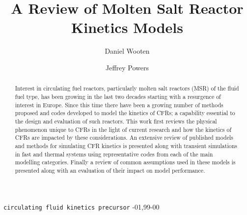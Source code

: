 \documentclass[review]{elsarticle}
\begin{document}
\begin{frontmatter}

\title{A Review of Molten Salt Reactor Kinetics Models}

\author[ucb]{Daniel Wooten}
\address[ucb]{4155 Etcheverry Hall, MC 1730, University of California, Berkeley,
    Berkeley, CA 94720-1730}

\author[ornl]{Jeffrey Powers}
\address[ornl]{Oak Ridge}

\begin{abstract}
Interest in circulating fuel reactors, particularly molten salt reactors (MSR)
 of the
fluid fuel type, has been growing in the last two decades starting with a
resurgence of interest in Europe. Since this time there have been a growing
number of methods proposed and codes developed to model the kinetics of CFRs;
a capability essential to the design and evaluation of such reactors. This work
first reviews the physical phenomenon unique to CFRs in the light of current
research and how the kinetics of CFRs are impacted by these considerations.
 An extensive review of published models and methods for simulating CFR kinetics
is presented along with transient simulations in fast and thermal systems using
representative codes from each of the main modelling categories. Finally a
review of common assumptions used in these models is presented along with an
evaluation of their impact on model performance. 
\end{abstract}

\begin{keyword}
\texttt{circulating fluid kinetics precursor}
-01\sep  99-00
\end{keyword}

\end{frontmatter}

\linenumbers
\end{document}
